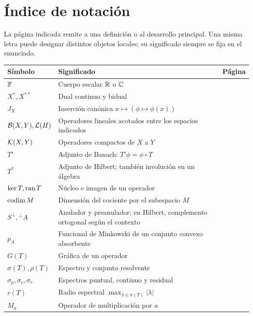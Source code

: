\chapter*{Índice de notación}
La página indicada remite a una definición o al desarrollo principal. Una misma letra puede designar distintos objetos locales; su significado siempre se fija en el enunciado.
\begin{longtable}{@{}p{}p{}r@{}}
\toprule
Símbolo & Significado & Página\\\midrule\endhead
$\mathbb F$ & Cuerpo escalar $\mathbb R$ o $\mathbb C$ & \pageref{cap:v3-01}\\
$X^*,X^{**}$ & Dual continuo y bidual & \pageref{cap:v3-02}\\
$J_X$ & Inserción canónica $x\mapsto(\phi\mapsto\phi(x))$ & \pageref{v3:normantes}\\
$\mathcal B(X,Y),\mathcal L(H)$ & Operadores lineales acotados entre los espacios indicados & \pageref{v3:acotacion}\\
$\mathcal K(X,Y)$ & Operadores compactos de $X$ a $Y$ & \pageref{v3:aproximacion-compactos}\\
$T'$ & Adjunto de Banach: $T'\phi=\phi\circ T$ & \pageref{v3:adjunto-banach}\\
$T^*$ & Adjunto de Hilbert; también involución en un álgebra & \pageref{v3:riesz-adjunto}\\
$\ker T,\operatorname{ran} T$ & Núcleo e imagen de un operador & \pageref{v3:rango-cerrado}\\
$\operatorname{codim} M$ & Dimensión del cociente por el subespacio $M$ & \pageref{ej:v3-l10-1}\\
$S^\perp,{}^\perp A$ & Anulador y preanulador; en Hilbert, complemento ortogonal según el contexto & \pageref{v3:doble-anulador}\\
$p_A$ & Funcional de Minkowski de un conjunto convexo absorbente & \pageref{v3:minkowski}\\
$G(T)$ & Gráfica de un operador & \pageref{v3:grafica-cerrada}\\
$\sigma(T),\rho(T)$ & Espectro y conjunto resolvente & \pageref{lec:v3-07}\\
$\sigma_p,\sigma_c,\sigma_r$ & Espectros puntual, continuo y residual & \pageref{lec:v3-07}\\
$r(T)$ & Radio espectral $\max_{\lambda\in\sigma(T)}|\lambda|$ & \pageref{v3:gelfand-radio}\\
$M_a$ & Operador de multiplicación por $a$ & \pageref{v3:multiplicadores}\\

\end{longtable}

